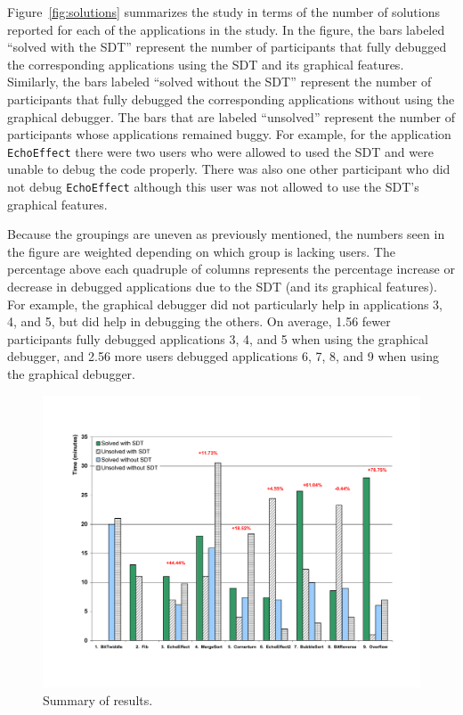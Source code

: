 \documentclass[11pt, letterpaper, onecolumn]{article}
\begin{document}
Figure~\ref{fig:solutions} summarizes the study in terms of the number
of solutions  reported for each of  the applications in  the study. In
the figure,  the bars  labeled ``solved with  the SDT''  represent the
number   of  participants  that   fully  debugged   the  corresponding
applications using the SDT and its graphical features.  Similarly, the
bars  labeled  ``solved without  the  SDT''  represent  the number  of
participants  that  fully   debugged  the  corresponding  applications
without  using  the graphical  debugger.  The  bars  that are  labeled
``unsolved'' represent  the number of  participants whose applications
remained buggy.  For example, for  the application \texttt{EchoEffect}
there were two users who were  allowed to used the SDT and were unable
to debug the  code properly. There was also  one other participant who
did not  debug \texttt{EchoEffect} although this user  was not allowed
to use the SDT's graphical features.

Because the groupings are  uneven as previously mentioned, the numbers
seen in  the figure are weighted  depending on which  group is lacking
users. The  percentage above each quadruple of  columns represents the
percentage increase  or decrease in  debugged applications due  to the
SDT (and its graphical features).  For example, the graphical debugger
did not particularly help in applications 3, 4, and 5, but did help in
debugging  the  others.  On  average,  1.56  fewer participants  fully
debugged applications 3,  4, and 5 when using  the graphical debugger,
and 2.56  more users debugged applications  6, 7, 8, and  9 when using
the graphical debugger.

\begin{figure}[t]
\begin{center}
  \includegraphics[scale=.5, angle=0]{./times-results.pdf}
  \caption{Summary of results.}
  \label{fig:times}
\end{center}
\end{figure}
\end{document}

